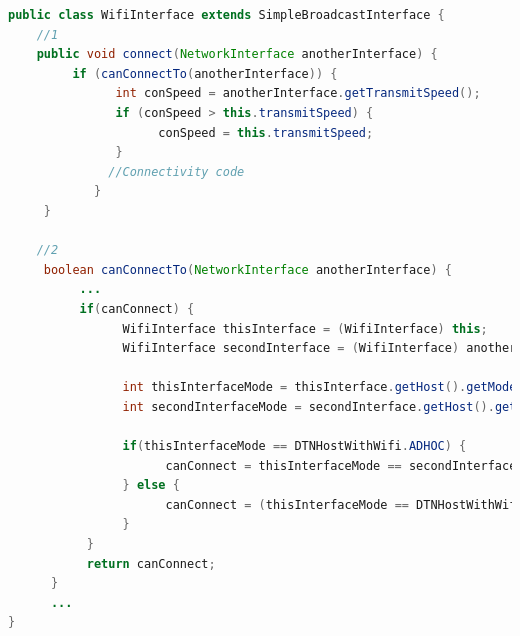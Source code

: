 \newpage
\begin{lstlisting}[language=java]
public class WifiInterface extends SimpleBroadcastInterface {
    //1
    public void connect(NetworkInterface anotherInterface) {
         if (canConnectTo(anotherInterface)) {
               int conSpeed = anotherInterface.getTransmitSpeed();
               if (conSpeed > this.transmitSpeed) {
                     conSpeed = this.transmitSpeed;
               }
              //Connectivity code
	        }
     }

    //2
     boolean canConnectTo(NetworkInterface anotherInterface) {
          ...
          if(canConnect) {
                WifiInterface thisInterface = (WifiInterface) this;
                WifiInterface secondInterface = (WifiInterface) anotherInterface;

                int thisInterfaceMode = thisInterface.getHost().getMode();
                int secondInterfaceMode = secondInterface.getHost().getMode();

                if(thisInterfaceMode == DTNHostWithWifi.ADHOC) {
                      canConnect = thisInterfaceMode == secondInterfaceMode;
                } else {
                      canConnect = (thisInterfaceMode == DTNHostWithWifi.AP && secondInterfaceMode == DTNHostWithWifi.SA) || (thisInterfaceMode == DTNHostWithWifi.SA && secondInterfaceMode == DTNHostWithWifi.AP);
                }
           }
           return canConnect;
      }
      ...
}
\end{lstlisting}
\label{listing:dtnhostwithwifi}
\newpage

